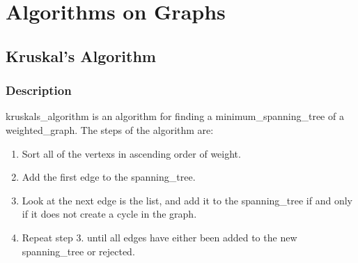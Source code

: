     \newpage

\section{Algorithms on Graphs} \label{algorithms_on_graphs}
    \subsection{Kruskal's Algorithm}
        \subsubsection{Description}
            \Gls{kruskals_algorithm} is an \gls{algorithm} for finding a \gls{minimum_spanning_tree} of a \gls{weighted_graph}.
            The steps of the \gls{algorithm} are:
            \begin{enumerate}
                \item Sort all of the \glspl{vertex} in ascending order of weight.
                \item Add the first \gls{edge} to the \gls{spanning_tree}.
                \item Look at the next \gls{edge} is the list, and add it to the \gls{spanning_tree} if and only if it does not create a \gls{cycle} in the \gls{graph}.
                \item Repeat step 3. until all \glspl{edge} have either been added to the new \gls{spanning_tree} or rejected.
            \end{enumerate}

